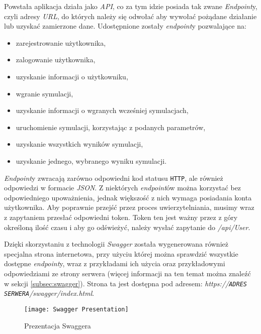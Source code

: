 \par Powstała aplikacja działa jako \emph{API}, co za tym idzie posiada tak zwane \emph{Endpoint}y, czyli adresy \emph{URL}, do których należy się odwołać aby wywołać pożądane działanie lub uzyskać zamierzone dane. Udostępnione zostały \emph{endpoint}y pozwalające na:
\begin{itemize}
	\item zarejestrowanie użytkownika,
	\item zalogowanie użytkownika,
	\item uzyskanie informacji o użytkowniku,
	\item wgranie symulacji,
	\item uzyskanie informacji o wgranych wcześniej symulacjach,
	\item uruchomienie symulacji, korzystając z podanych parametrów,
	\item uzyskanie wszystkich wyników symulacji,
	\item uzyskanie jednego, wybranego wyniku symulacji.
\end{itemize}

\par \emph{Endpoint}y zwracają zarówno odpowiedni kod statusu \texttt{HTTP}, ale również odpowiedzi w formacie \emph{JSON}. Z niektórych \emph{endpoint}ów można korzystać bez odpowiedniego upoważnienia, jednak większość z nich wymaga posiadania konta użytkownika. Aby poprawnie przejść przez proces uwierzytelniania, musimy wraz z zapytaniem przesłać odpowiedni token. Token ten jest ważny przez z góry określoną ilość czasu i aby go odświeżyć, należy wysłać zapytanie do \emph{/api/User}.

\par Dzięki skorzystaniu z technologii \emph{Swagger} została wygenerowana również specjalna strona internetowa, przy użyciu której można sprawdzić wszystkie dostępne \emph{endpoint}y, wraz z przykładami ich użycia oraz przykładowymi odpowiedziami ze strony serwera (więcej informacji na ten temat można znaleźć w sekcji \ref{subsec:swagger}). Strona ta jest dostępna pod adresem: \emph{https://\texttt{ADRES SERWERA}/swagger/index.html}.

\begin{figure}[H]
	\texttt{[image: Swagger Presentation]}
	\caption{Prezentacja Swaggera}
\end{figure}

